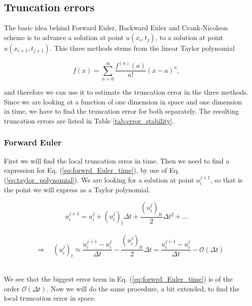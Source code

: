 \documentclass[12pt]{article}
\begin{document}
\begin{flushleft}
\subsection{Truncation errors\label{sect:truncation_error}}
The basic idea behind Forward Euler, Backward Euler and Crank-Nicolson scheme is to advance a solution at point $u(x_i,t_j)$, to a solution at point $u(x_{i+1},t_{j+1})$. This three methods stems from the linear Taylor polynomial

\vspace{5mm}
\begin{equation}\label{eq:taylor_polynomial}
f(x) = \sum\limits_{n=0}^{\infty}\frac{f^{(n)}(a)}{n!}(x-a)^n,
\end{equation}
\vspace{5mm} 

and therefore we can use it to estimate the truncation error in the three methods. Since we are looking at a function of one dimension in space and one dimension in time, we have to find the truncation error for both separately. The resulting truncation errors are listed in Table \ref{tab:error_stability}.
\subsubsection{Forward Euler}
First we will find the local truncation error in time. Then we need to find a expression for Eq. (\ref{eq:forwrd_Euler_time}), by use of Eq. (\ref{eq:taylor_polynomial}). We are looking for a solution at point $u_i^{j+1}$, so that is the point we will express as a Taylor polynomial.

\vspace{5mm}
$$u_i^{j+1} = u_i^j + (u_i^j)_t\Delta t + \frac{(u_i^j)_{tt}}{2}\Delta t^2 + \dots$$\\
\vspace{5mm} 
$$\quad\Rightarrow\quad (u_i^j)_t \simeq \frac{u_i^{j+1}-u_i^j}{\Delta t} - \frac{(u_i^j)_{tt}}{2}\Delta t = \frac{u_i^{j+1}-u_i^j}{\Delta t} - \mathcal{O}(\Delta t)$$\\
\vspace{5mm}

We see that the biggest error term in Eq. (\ref{eq:forwrd_Euler_time}) is of the order $\mathcal{O}(\Delta t)$. Now we will do the same procedure, a bit extended, to find the local truncation error in space.


\end{flushleft}
\end{document}
